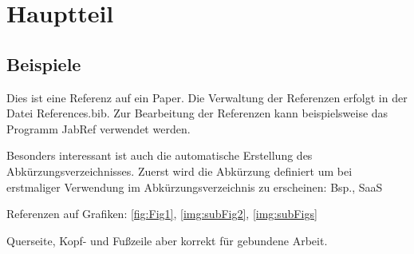 
\chapter{Hauptteil}
\label{chap:Hauptteil}


\section{Beispiele}
Dies  ist eine Referenz auf ein Paper. Die Verwaltung der Referenzen erfolgt in der Datei References.bib. Zur Bearbeitung der Referenzen kann beispielsweise das Programm JabRef verwendet werden.

Besonders interessant ist auch die automatische Erstellung des Abkürzungsverzeichnisses. Zuerst wird die Abkürzung definiert um bei erstmaliger Verwendung im Abkürzungsverzeichnis zu erscheinen: \ac{Bsp.}, \ac{SaaS}

Referenzen auf Grafiken: \ref{fig:Fig1}, \ref{img:subFig2}, \ref{img:subFigs}




\begin{landscape}
Querseite, Kopf- und Fußzeile aber korrekt für gebundene Arbeit.
\end{landscape}

%


